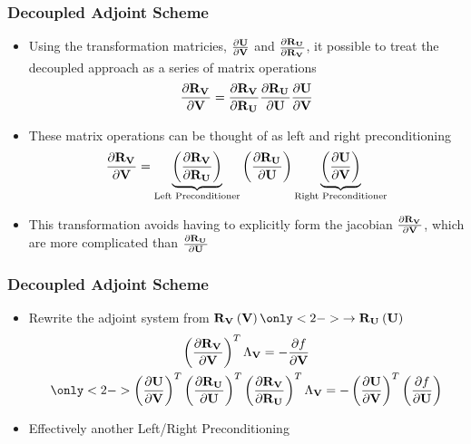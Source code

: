 \documentclass{beamer}
\begin{document}
\begin{frame}
  \frametitle{Decoupled Adjoint Scheme}
  \begin{itemize}
    \item<1-> Using the transformation matricies, $\frac{\partial \mathbf U}{\partial \mathbf V}$ and
      $\frac{\partial \mathbf R_{{\mathbf U}_{}}}{\partial \mathbf R_{{\mathbf V}_{}}}$, it possible to treat the decoupled approach as a
      series of matrix operations
      \begin{equation*}
        \frac{\partial \mathbf R_{{\mathbf V}_{}}}{\partial \mathbf V} = \frac{\partial \mathbf R_{{\mathbf V}_{}}}{\partial \mathbf R_{{\mathbf U}_{}}} \frac{\partial \mathbf R_{{\mathbf U}_{}}}{\partial \mathbf U} \frac{\partial \mathbf U}{\partial \mathbf V}
      \end{equation*}
    \item<2-> These matrix operations can be thought of as left and right
      preconditioning
      \begin{equation*}
        \frac{\partial \mathbf R_{{\mathbf V}_{}}}{\partial \mathbf V} = 
        \underbrace{ \left(\frac{\partial \mathbf R_{{\mathbf V}_{}}}{\partial \mathbf R_{{\mathbf U}_{}}}\right) }_{\text{Left Preconditioner}}
        \left(\frac{\partial \mathbf R_{{\mathbf U}_{}}}{\partial \mathbf U}\right)
        \underbrace{ \left(\frac{\partial \mathbf U}{\partial \mathbf V}\right) }_{\text{Right Preconditioner}}
      \end{equation*}
    \item<3-> This transformation avoids having to explicitly form the jacobian
      $\frac{\partial \mathbf R_{{\mathbf V}_{}}}{\partial \mathbf V}$, which are more complicated than $\frac{\partial \mathbf R_{{\mathbf U}_{}}}{\partial \mathbf U}$
  \end{itemize}
\end{frame}
\begin{frame}
  \frametitle{Decoupled Adjoint Scheme}
  \begin{itemize}
    \item Rewrite the adjoint system from 
      $\rv{}\left( \mv \right) \only<2->{\rightarrow \ru{}\left( \mU \right)}$
      \begin{gather*}
        \left( \pd{\rv{}}{\mv} \right)^T \adjlam{\mv} = -\pd{f}{\mv} \\
        \only<2->{
          \left( \pd{\mU}{\mv} \right)^T 
          \left( \pd{\ru{}}{\mU} \right)^T 
          \left( \pd{\rv{}}{\ru{}} \right)^T 
          \adjlam{\mv} = -\left( \pd{\mU}{\mv} \right)^T
          \left(\pd{f}{\mU}\right)
        }
      \end{gather*}
    \item<3-> Effectively another Left/Right Preconditioning
  \end{itemize}
  \vspace{0.2cm}
\end{frame}
\end{document}
